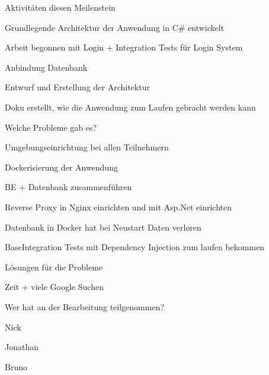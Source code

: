 \documentclass{beamer}
\begin{document}
\begin{frame}
    \begin{description}[font=$\bullet$]
        \item Aktivitäten diesen Meilenstein
              \begin{description}[font=$\bullet$]
                  \item Grundlegende Architektur der Anwendung in C\# entwickelt
                  \item Arbeit begonnen mit Login + Integration Tests für Login System
                  \item Anbindung Datenbank
                  \item Entwurf und Erstellung der Architektur
                  \item Doku erstellt, wie die Anwendung zum Laufen gebracht werden kann
              \end{description}



        \item Welche Probleme gab es?
              \begin{description}[font=$\bullet$]
                  \item Umgebungseinrichtung bei allen Teilnehmern
                  \item Dockerisierung der Anwendung
                  \item BE + Datenbank zusammenführen
                  \item Reverse Proxy in Nginx einrichten und mit Asp.Net einrichten
                  \item Datenbank in Docker hat bei Neustart Daten verloren
                  \item BaseIntegration Tests mit Dependency Injection zum laufen bekommen
              \end{description}
    \end{description}
\end{frame}
\begin{frame}
    \begin{description}[font=$\bullet$]
        \item Lösungen für die Probleme
              \begin{description}[font=$\bullet$]
                  \item Zeit + viele Google Suchen
              \end{description}
        \item Wer hat an der Bearbeitung teilgenommen?
              \begin{description}[font=$\bullet$]
                  \item Nick
                  \item Jonathan
                  \item Bruno
              \end{description}
    \end{description}
\end{frame}
\end{document}
